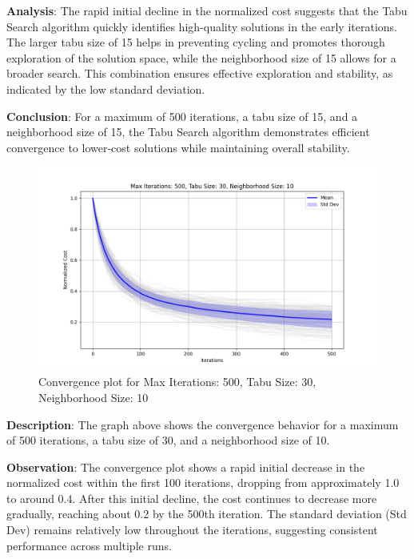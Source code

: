 \documentclass[
]{article}
\begin{document}
    \textbf{Analysis}: The rapid initial decline in the normalized cost suggests that the Tabu Search algorithm quickly identifies high-quality solutions in the early iterations. The larger tabu size of 15 helps in preventing cycling and promotes thorough exploration of the solution space, while the neighborhood size of 15 allows for a broader search. This combination ensures effective exploration and stability, as indicated by the low standard deviation.

    \textbf{Conclusion}: For a maximum of 500 iterations, a tabu size of 15, and a neighborhood size of 15, the Tabu Search algorithm demonstrates efficient convergence to lower-cost solutions while maintaining overall stability.


    \begin{figure}[H]
        \centering
        \includegraphics[width=\textwidth]{tabu_search/max_iter_500_tabu_size_30_neighborhood_size_10}
        \caption{Convergence plot for Max Iterations: 500, Tabu Size: 30, Neighborhood Size: 10}
        \label{fig:ts_500_30_10}
    \end{figure}

    \textbf{Description}: The graph above shows the convergence behavior for a maximum of 500 iterations, a tabu size of 30, and a neighborhood size of 10.

    \textbf{Observation}: The convergence plot shows a rapid initial decrease in the normalized cost within the first 100 iterations, dropping from approximately 1.0 to around 0.4. After this initial decline, the cost continues to decrease more gradually, reaching about 0.2 by the 500th iteration. The standard deviation (Std Dev) remains relatively low throughout the iterations, suggesting consistent performance across multiple runs.
\end{document}
